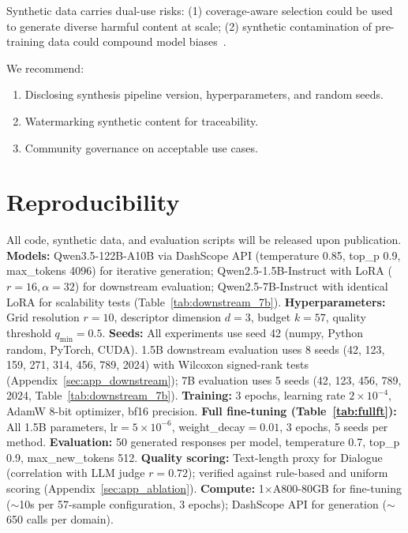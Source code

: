 \documentclass{article}
\theoremstyle{plain}
\theoremstyle{remark}
\begin{document}
Synthetic data carries dual-use risks: (1) coverage-aware selection could be used to generate diverse harmful content at scale; (2) synthetic contamination of pre-training data could compound model biases~\citep{data_collapse_2024}.

We recommend:
\begin{enumerate}[nosep]
  \item Disclosing synthesis pipeline version, hyperparameters, and random seeds.
  \item Watermarking synthetic content for traceability.
  \item Community governance on acceptable use cases.
\end{enumerate}

\section*{Reproducibility}

All code, synthetic data, and evaluation scripts will be released upon publication.
\textbf{Models:} Qwen3.5-122B-A10B via DashScope API (temperature 0.85, top\_p 0.9, max\_tokens 4096) for iterative generation; Qwen2.5-1.5B-Instruct with LoRA ($r{=}16, \alpha{=}32$) for downstream evaluation; Qwen2.5-7B-Instruct with identical LoRA for scalability tests (Table~\ref{tab:downstream_7b}).
\textbf{Hyperparameters:} Grid resolution $r{=}10$, descriptor dimension $d{=}3$, budget $k{=}57$, quality threshold $q_{\min}{=}0.5$.
\textbf{Seeds:} All experiments use seed 42 (numpy, Python random, PyTorch, CUDA). 1.5B downstream evaluation uses 8 seeds (42, 123, 159, 271, 314, 456, 789, 2024) with Wilcoxon signed-rank tests (Appendix~\ref{sec:app_downstream}); 7B evaluation uses 5 seeds (42, 123, 456, 789, 2024, Table~\ref{tab:downstream_7b}).
\textbf{Training:} 3 epochs, learning rate $2{\times}10^{-4}$, AdamW 8-bit optimizer, bf16 precision.
\textbf{Full fine-tuning (Table~\ref{tab:fullft}):} All 1.5B parameters, lr$=5{\times}10^{-6}$, weight\_decay$=0.01$, 3 epochs, 5 seeds per method.
\textbf{Evaluation:} 50 generated responses per model, temperature 0.7, top\_p 0.9, max\_new\_tokens 512.
\textbf{Quality scoring:} Text-length proxy for Dialogue (correlation with LLM judge $r{=}0.72$); verified against rule-based and uniform scoring (Appendix~\ref{sec:app_ablation}).
\textbf{Compute:} 1$\times$A800-80GB for fine-tuning ($\sim$10s per 57-sample configuration, 3 epochs); DashScope API for generation ($\sim$650 calls per domain).
\end{document}
